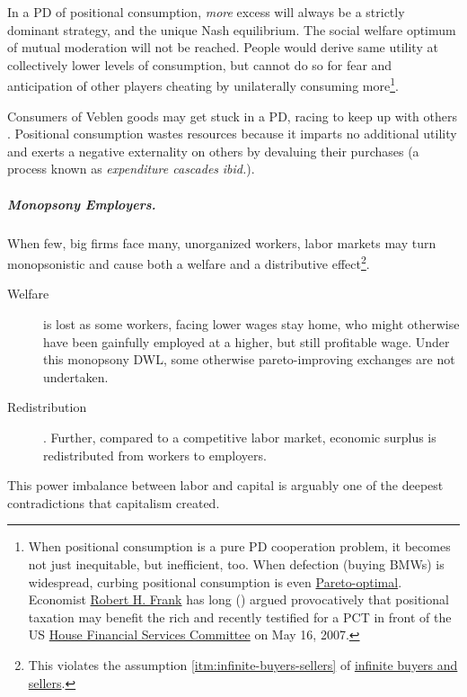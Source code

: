 In a \gls{PD} of positional consumption, \emph{more} excess will always be a strictly dominant strategy, and the unique Nash equilibrium. The social welfare optimum of mutual moderation will not be reached. People would derive same utility at collectively lower levels of consumption, but cannot do so for fear and anticipation of other players cheating by unilaterally consuming more\footnote{
	When positional consumption is a pure \gls{PD} cooperation problem, it becomes not just inequitable, but inefficient, too. When defection (buying BMWs) is widespread, curbing positional consumption is even \hyperref[sec:Pareto]{Pareto-optimal}. Economist \hyperref[http://www.robert-h-frank.com]{Robert H. Frank} has long (\citeyear{Frank1987}) argued provocatively that positional taxation may benefit the rich and recently testified for a \gls{PCT} in front of the US \hyperref[http://financialservices.house.gov/]{House Financial Services Committee} on May 16, 2007.}.

Consumers of Veblen goods may get stuck in a \gls{PD}, racing to keep up with others \citep{Frank1987}. Positional consumption wastes resources because it imparts no additional utility and exerts a negative externality on others by devaluing their purchases (a process known as \emph{expenditure cascades} \emph{ibid.}). 

\subparagraph[Monopsony Employers]{Monopsony Employers.} \label{sec:monopsony-employers} When few, big firms face many, unorganized workers, labor markets may turn monopsonistic and cause both a welfare and a distributive effect\footnote{
	This violates the  assumption \ref{itm:infinite-buyers-sellers} of \hyperref[itm:infinite-buyers-sellers]{infinite buyers and sellers}.}.
\begin{description}
	\item[Welfare] is lost as some workers, facing lower wages stay home, who might otherwise have been gainfully employed at a higher, but still profitable wage. Under this monopsony \gls{DWL}, some otherwise pareto-improving exchanges are not undertaken. 
	\item[Redistribution]. Further, compared to a competitive labor market, economic surplus is redistributed from workers to employers. 
\end{description}

This power imbalance between labor and capital is arguably one of the deepest contradictions that capitalism created. 

